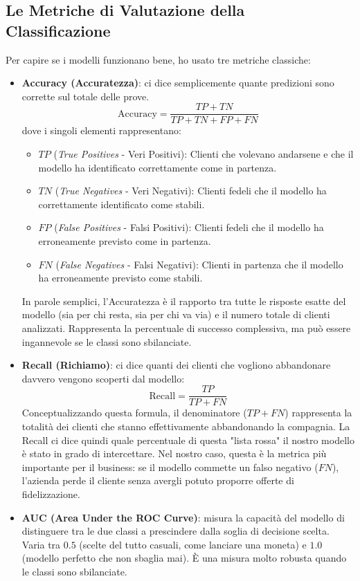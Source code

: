 \documentclass[a4paper,11pt]{article}
\begin{document}
\subsection{Le Metriche di Valutazione della Classificazione}
Per capire se i modelli funzionano bene, ho usato tre metriche classiche:
\begin{itemize}
    \item \textbf{Accuracy (Accuratezza)}: ci dice semplicemente quante predizioni sono corrette sul totale delle prove.
    \begin{equation}
        \text{Accuracy} = \frac{TP + TN}{TP + TN + FP + FN}
    \end{equation}
    dove i singoli elementi rappresentano:
    \begin{itemize}
        \item $TP$ (\textit{True Positives} - Veri Positivi): Clienti che volevano andarsene e che il modello ha identificato correttamente come in partenza.
        \item $TN$ (\textit{True Negatives} - Veri Negativi): Clienti fedeli che il modello ha correttamente identificato come stabili.
        \item $FP$ (\textit{False Positives} - Falsi Positivi): Clienti fedeli che il modello ha erroneamente previsto come in partenza.
        \item $FN$ (\textit{False Negatives} - Falsi Negativi): Clienti in partenza che il modello ha erroneamente previsto come stabili.
    \end{itemize}
    In parole semplici, l'Accuratezza è il rapporto tra tutte le risposte esatte del modello (sia per chi resta, sia per chi va via) e il numero totale di clienti analizzati. Rappresenta la percentuale di successo complessiva, ma può essere ingannevole se le classi sono sbilanciate.
    \item \textbf{Recall (Richiamo)}: ci dice quanti dei clienti che vogliono abbandonare davvero vengono scoperti dal modello:
    \begin{equation}
        \text{Recall} = \frac{TP}{TP + FN}
    \end{equation}
    Conceptualizzando questa formula, il denominatore ($TP + FN$) rappresenta la totalità dei clienti che stanno effettivamente abbandonando la compagnia. La Recall ci dice quindi quale percentuale di questa "lista rossa" il nostro modello è stato in grado di intercettare. Nel nostro caso, questa è la metrica più importante per il business: se il modello commette un falso negativo ($FN$), l'azienda perde il cliente senza avergli potuto proporre offerte di fidelizzazione.
    \item \textbf{AUC (Area Under the ROC Curve)}: misura la capacità del modello di distinguere tra le due classi a prescindere dalla soglia di decisione scelta. Varia tra $0.5$ (scelte del tutto casuali, come lanciare una moneta) e $1.0$ (modello perfetto che non sbaglia mai). È una misura molto robusta quando le classi sono sbilanciate.
\end{itemize}
\end{document}
